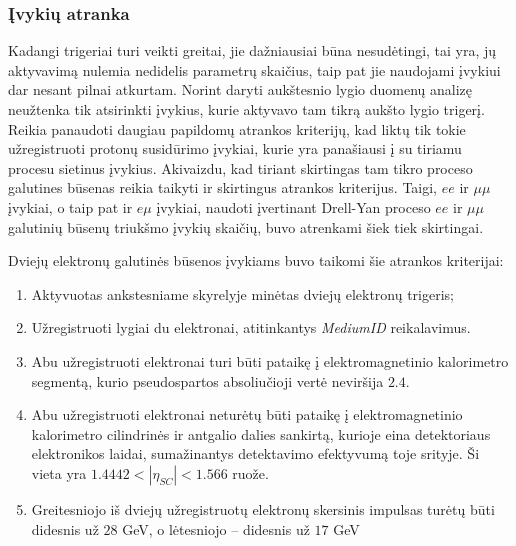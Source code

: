 \documentclass[a4paper, 12pt]{article}
\newcommand{\mumu}{\mu\mu}
\begin{document}
\subsubsection{Įvykių atranka}

Kadangi trigeriai turi veikti greitai, jie dažniausiai būna nesudėtingi, tai yra, jų aktyvavimą nulemia
nedidelis parametrų skaičius, taip pat jie naudojami įvykiui dar nesant pilnai atkurtam.
Norint daryti aukštesnio lygio duomenų analizę neužtenka tik atsirinkti įvykius, kurie aktyvavo tam tikrą
aukšto lygio trigerį.
Reikia panaudoti daugiau papildomų atrankos kriterijų, kad liktų tik tokie užregistruoti protonų susidūrimo
įvykiai, kurie yra panašiausi į su tiriamu procesu sietinus įvykius.
Akivaizdu, kad tiriant skirtingas tam tikro proceso galutines būsenas reikia taikyti ir skirtingus atrankos
kriterijus.
Taigi, $ee$ ir $\mumu$ įvykiai, o taip pat ir $e\mu$ įvykiai, naudoti įvertinant Drell-Yan proceso $ee$ ir
$\mumu$ galutinių būsenų triukšmo įvykių skaičių, buvo atrenkami šiek tiek skirtingai.

Dviejų elektronų galutinės būsenos įvykiams buvo taikomi šie atrankos kriterijai:
\begin{enumerate}
	\item Aktyvuotas ankstesniame skyrelyje minėtas dviejų elektronų trigeris;
	\item Užregistruoti lygiai du elektronai, atitinkantys \textit{MediumID} reikalavimus.
	\item Abu užregistruoti elektronai turi būti pataikę į elektromagnetinio kalorimetro segmentą, kurio
	pseudospartos absoliučioji vertė neviršija $2.4$.
	\item Abu užregistruoti elektronai neturėtų būti pataikę į elektromagnetinio kalorimetro cilindrinės ir
	antgalio dalies sankirtą, kurioje eina detektoriaus elektronikos laidai, sumažinantys detektavimo efektyvumą
	toje srityje. Ši vieta yra $1.4442<|\eta_{SC}|<1.566$ ruože.
	\item Greitesniojo iš dviejų užregistruotų elektronų skersinis impulsas turėtų būti didesnis už $28$ GeV, o
	lėtesniojo -- didesnis už $17$ GeV
\end{enumerate}
\end{document}
